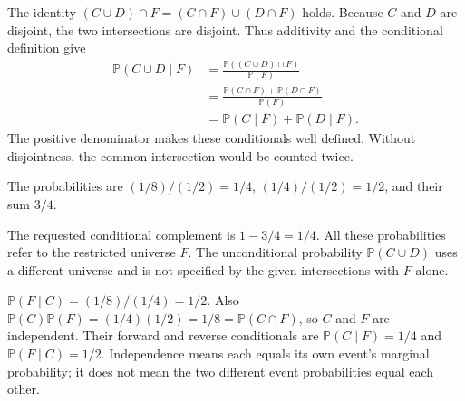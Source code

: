 \documentclass[11pt]{article}
\begin{document}
\begin{parts}
\item The identity $(C\cup D)\cap F=(C\cap F)\cup(D\cap F)$ holds. Because $C$ and $D$ are disjoint, the two intersections are disjoint. Thus additivity and the conditional definition give
\begin{align*}
\mathbb P(C\cup D\mid F)
&=\frac{\mathbb P((C\cup D)\cap F)}{\mathbb P(F)}\\
&=\frac{\mathbb P(C\cap F)+\mathbb P(D\cap F)}{\mathbb P(F)}\\
&=\mathbb P(C\mid F)+\mathbb P(D\mid F).
\end{align*}
The positive denominator makes these conditionals well defined. Without disjointness, the common intersection would be counted twice.
\item The probabilities are $(1/8)/(1/2)=1/4$, $(1/4)/(1/2)=1/2$, and their sum $3/4$.
\item The requested conditional complement is $1-3/4=1/4$. All these probabilities refer to the restricted universe $F$. The unconditional probability $\mathbb P(C\cup D)$ uses a different universe and is not specified by the given intersections with $F$ alone.
\item $\mathbb P(F\mid C)=(1/8)/(1/4)=1/2$. Also $\mathbb P(C)\mathbb P(F)=(1/4)(1/2)=1/8=\mathbb P(C\cap F)$, so $C$ and $F$ are independent. Their forward and reverse conditionals are $\mathbb P(C\mid F)=1/4$ and $\mathbb P(F\mid C)=1/2$. Independence means each equals its own event's marginal probability; it does not mean the two different event probabilities equal each other.
\end{parts}
\end{document}
